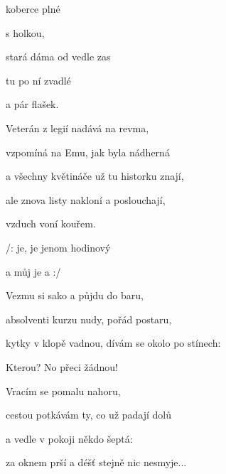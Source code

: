 

\zs
{} koberce plné 

 s holkou,  

 stará dáma od vedle zas 

 tu po ní zvadlé 

a pár  flašek.

\ks
\zs

Veterán z legií nadává na revma,

vzpomíná na Emu, jak byla nádherná

a všechny květináče už tu historku znají,

ale znova listy nakloní a poslouchají,

vzduch voní kouřem.
\ks

\zr
/:  je,  je jenom hodinový 

a můj  je  a  :/
\kr

\zs
Vezmu si sako a půjdu do baru,

absolventi kurzu nudy, pořád postaru,

kytky v klopě vadnou, dívám se okolo po stínech:

Kterou? No přeci žádnou!

\ks
\zs

Vracím se pomalu nahoru,

cestou potkávám ty, co už padají dolů

a vedle v pokoji někdo šeptá: 

za oknem prší a déšť stejně nic nesmyje...
\ks

\zr  \kr

\kp
